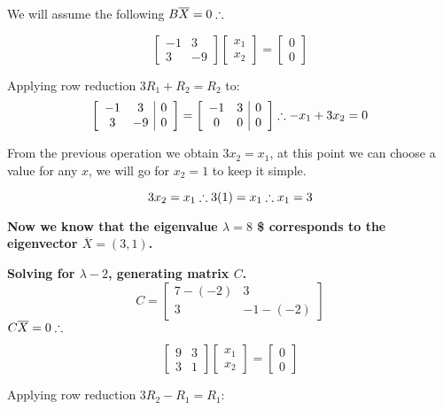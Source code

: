 \documentclass[]{book}
\begin{document}
We will assume the following \(B \overline X = 0 \space \therefore\)

\[\left[ \begin{array}{cc}
-1 & 3 \\
3 & -9  \end{array} \right] \left[ \begin{array}{cc}
x_1 \\
x_2 \end{array} \right] = \left[ \begin{array}{cc}
0 \\
0 \end{array} \right]\]

Applying row reduction \(3R_1 + R_2 = R_2\) to:
\[\left[ \begin{array}{cc|r}
-1 & 3 & 0\\
3 & -9 & 0  \end{array} \right] = \left[ \begin{array}{cc|r}
-1 & 3 & 0\\
0 & 0 & 0  \end{array} \right] \space \therefore -x_1+3x_2 = 0\]

From the previous operation we obtain \(3x_2 = x_1\), at this point we
can choose a value for any \(x\), we will go for \(x_2 = 1\) to keep it
simple.

\[3x_2 = x_1 \space \therefore 3(1) = x_1 \space \therefore \space x_1 = 3\]

\textbf{Now we know that the eigenvalue \(\lambda = 8\) \$ corresponds
to the eigenvector \(\overline X = (3,1)\).}

\textbf{Solving for \(\lambda -2\), generating matrix \(C\).}
\[C = \left[ \begin{array}{cc}
7-(-2) & 3 \\
3 & -1-(-2)  \end{array} \right]\]
\(C\overline X = 0 \space \therefore\)

\[\left[ \begin{array}{cc}
9 & 3 \\
3 & 1  \end{array} \right] \left[ \begin{array}{c}
x_1 \\
x_2  \end{array} \right] = \left[ \begin{array}{c}
0 \\
0  \end{array} \right]\]

Applying row reduction \(3R_2 - R_1 = R_1\):
\end{document}

